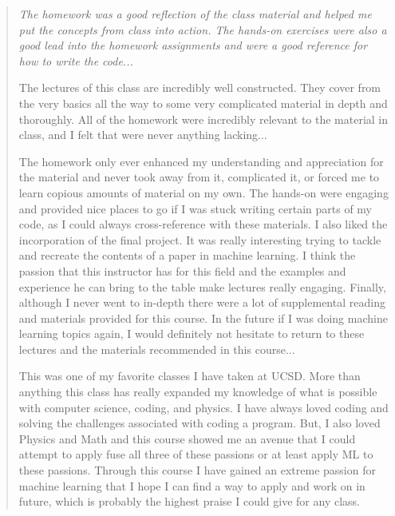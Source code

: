 \documentclass[11pt,letterpaper,notitlepage]{article}
\begin{document}
\begin{quotation}
    \itshape
    The homework was a good reflection of the class material and helped me put the concepts from class into action.
    The hands-on exercises were also a good lead into the homework assignments and were a good reference for how to write the code...

    The lectures of this class are incredibly well constructed.
    They cover from the very basics all the way to some very complicated material in depth and thoroughly.
    All of the homework were incredibly relevant to the material in class, and I felt that were never anything lacking...

    The homework only ever enhanced my understanding and appreciation for the material and never took away from it, complicated it, or forced me to learn copious amounts of material on my own.
    The hands-on were engaging and provided nice places to go if I was stuck writing certain parts of my code, as I could always cross-reference with these materials. I also liked the incorporation of the final project.
    It was really interesting trying to tackle and recreate the contents of a paper in machine learning.
    I think the passion that this instructor has for this field and the examples and experience he can bring to the table make lectures really engaging. Finally, although I never went to in-depth there were a lot of supplemental reading and materials provided for this course.
    In the future if I was doing machine learning topics again, I would definitely not hesitate to return to these lectures and the materials recommended in this course...

    This was one of my favorite classes I have taken at UCSD. More than anything this class has really expanded my knowledge of what is possible with computer science, coding, and physics. I have always loved coding and solving the challenges associated with coding a program.
    But, I also loved Physics and Math and this course showed me an avenue that I could attempt to apply fuse all three of these passions or at least apply ML to these passions.
    Through this course I have gained an extreme passion for machine learning that I hope I can find a way to apply and work on in future, which is probably the highest praise I could give for any class.
\end{quotation}
\end{document}

